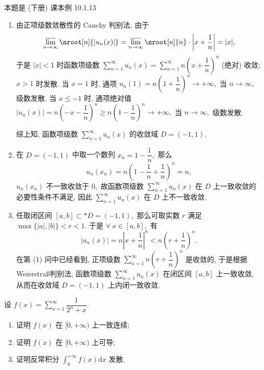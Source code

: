 \begin{solution}
本题是 (下册) 课本例 10.1.13

\begin{enumerate}
\item 由正项级数敛散性的 Cauchy 判别法, 由于
$$\varlimsup_{n\to\infty} \nroot[n]{\lvert u_n(x) \rvert} = \varlimsup_{n\to\infty} \nroot[n]{n} \cdot \left\lvert x + \dfrac{1}{n} \right\rvert = \lvert x \rvert,$$
于是 $\lvert x \rvert < 1$ 时函数项级数 $\sum\limits_{n=1}^{\infty} u_n(x) = \sum\limits_{n=1}^{\infty} n \left( x + \dfrac{1}{n} \right)^n$ (绝对) 收敛; $x > 1$ 时发散. 当 $x = 1$ 时, 通项 $u_n(1) = n \left( 1 + \dfrac{1}{n} \right)^n \to +\infty,$ 当 $n \to \infty,$ 级数发散. 当 $x \leqslant -1$ 时, 通项绝对值 $\lvert u_n(x) \rvert = n \left( -x - \dfrac{1}{n} \right)^n \geqslant n \left( 1 - \dfrac{1}{n} \right)^n \to +\infty,$ 当 $n \to \infty,$ 级数发散.

综上知, 函数项级数 $\sum\limits_{n=1}^{\infty} u_n(x)$ 的收敛域 $D = (-1, 1).$
\item 在 $D = (-1, 1)$ 中取一个数列 $x_n = 1 - \dfrac{1}{n},$ 那么
$$u_n(x_n) = n \left( 1 - \dfrac{1}{n} + \dfrac{1}{n} \right)^n = n,$$
$u_n(x_n)$ 不一致收敛于 $0,$ 故函数项级数 $\sum\limits_{n=1}^{\infty} u_n(x)$ 在 $D$ 上一致收敛的必要性条件不满足, 因此 $\sum\limits_{n=1}^{\infty} u_n(x)$ 在 $D$ 上不一致收敛.
\item 任取闭区间 $[a, b] \subset* D = (-1, 1),$ 那么可取实数 $r$ 满足 $\max\{\lvert a \rvert, \lvert b \rvert\} < r < 1.$ 于是 $\forall ~ x \in [a, b],$ 有
$$\lvert u_n(x) \rvert = n \left\lvert x + \dfrac{1}{n} \right\rvert^n < n \left( r + \dfrac{1}{n} \right)^n.$$
在第 (1) 问中已经看到, 正项级数 $\sum\limits_{n=1}^{\infty} n \left( r + \dfrac{1}{n} \right)^n$ 是收敛的, 于是根据 Weierstra\ss 判别法, 函数项级数 $\sum\limits_{n=1}^{\infty} u_n(x)$ 在闭区间 $[a, b]$ 上一致收敛, 从而在收敛域 $D = (-1, 1)$ 上内闭一致收敛.
\end{enumerate}
\end{solution}

\begin{question}[points = 10]
设 $f(x) = \sum\limits_{n=1}^\infty \dfrac{1}{2^n + x}.$
\begin{enumerate}
\item 证明 $f(x)$ 在 $[0, +\infty)$ 上一致连续;
\item 证明 $f(x)$ 在 $[0, +\infty)$ 上可导;
\item 证明反常积分 $\int_0^{+\infty} f(x) \mathrm{d} x$ 发散.
\end{enumerate}

\end{question}

